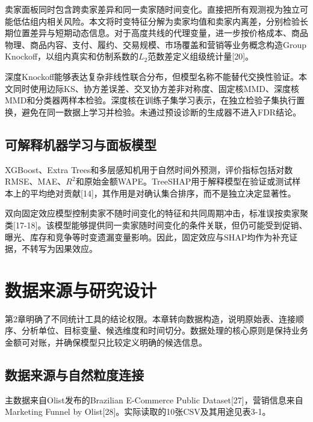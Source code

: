 \documentclass{sufethesismas}
\begin{document}
卖家面板同时包含跨卖家差异和同一卖家随时间变化。直接把所有观测视为独立可能低估组内相关风险。本文将时变特征分解为卖家均值和卖家内离差，分别检验长期位置差异与短期动态信息。对于高度共线的代理变量，进一步按价格成本、商品物理、商品内容、支付、履约、交易规模、市场覆盖和营销等业务概念构造Group Knockoff，以组内真实和仿制系数的\(L_2\)范数差定义组级统计量{[}20{]}。

深度Knockoff能够表达复杂非线性联合分布，但模型名称不能替代交换性验证。本文同时使用边际KS、协方差误差、交叉协方差非对称度、固定核MMD、深度核MMD和分类器两样本检验。深度核在训练子集学习表示，在独立检验子集执行置换，避免在同一数据上学习并检验。未通过预设诊断的生成器不进入FDR结论。

\section{可解释机器学习与面板模型}

XGBoost、Extra Trees和多层感知机用于自然时间外预测，评价指标包括对数RMSE、MAE、\(R^2\)和原始金额WAPE。TreeSHAP用于解释模型在验证或测试样本上的平均绝对贡献{[}14{]}，其作用是对确认集合排序，而不是独立决定显著性。

双向固定效应模型控制卖家不随时间变化的特征和共同周期冲击，标准误按卖家聚类{[}17-18{]}。该模型能够提供同一卖家随时间变化的条件关联，但仍可能受到促销、曝光、库存和竞争等时变遗漏变量影响。因此，固定效应与SHAP均作为补充证据，不转写为因果效应。

\chapter{数据来源与研究设计}

第2章明确了不同统计工具的结论权限。本章转向数据构造，说明原始表、连接顺序、分析单位、目标变量、候选维度和时间切分。数据处理的核心原则是保持业务金额可对账，并确保模型只比较定义明确的候选信息。

\section{数据来源与自然粒度连接}

主数据来自Olist发布的Brazilian E-Commerce Public Dataset{[}27{]}，营销信息来自Marketing Funnel by Olist{[}28{]}。实际读取的10张CSV及其用途见表3-1。
\end{document}

